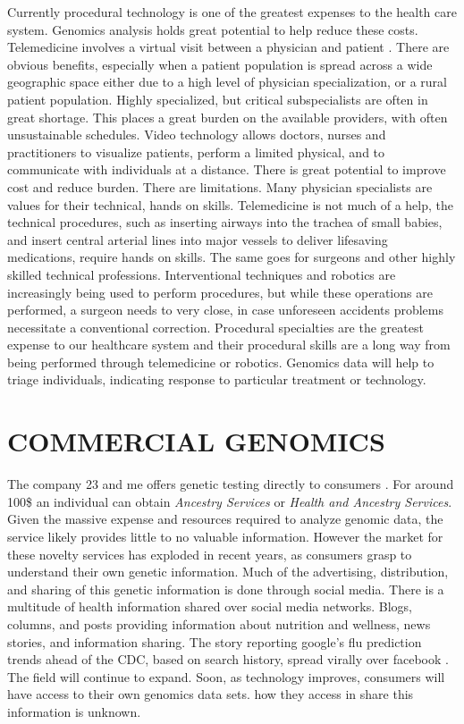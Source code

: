 \documentclass[sigconf]{acmart}
\begin{document}
Currently procedural technology is one of the greatest expenses to the health care system.  Genomics analysis holds great potential to help reduce these costs. Telemedicine involves a virtual visit between a physician and patient
\cite{hernandez2016pediatric}.  There are obvious benefits, especially when a patient population
is spread across a wide geographic space either due to a high level of
physician specialization, or a rural patient population. Highly
specialized, but critical subspecialists are often in great shortage.
This places a great burden on the available providers, with often
unsustainable schedules.  Video technology allows doctors, nurses and
practitioners to visualize patients, perform a limited physical, and
to communicate with individuals at a distance.  There is great
potential to improve cost and reduce burden. There are limitations.
Many physician specialists are values for their technical, hands on
skills.  Telemedicine is not much of a help, the technical procedures,
such as inserting airways into the trachea of small babies, and insert
central arterial lines into major vessels to deliver lifesaving
medications, require hands on skills.  The same goes for surgeons and
other highly skilled technical professions.  Interventional techniques
and robotics are increasingly being used to perform procedures, but
while these operations are performed, a surgeon needs to very close,
in case unforeseen accidents problems necessitate a conventional
correction. Procedural specialties are the greatest expense to our
healthcare system and their procedural skills are a long way from
being performed through telemedicine or robotics.  Genomics data will help to triage individuals, indicating response to particular treatment or technology.
 
 
\section{COMMERCIAL GENOMICS}

The company 23 and me offers genetic testing directly to consumers \cite{zettler201423andme}.  For around 100\$ an individual can obtain {\em Ancestry Services} or {\em Health and Ancestry Services}.  Given the massive expense and resources required to analyze genomic data, the service likely provides little to no valuable information.  However the market for these novelty services has exploded in recent years, as consumers grasp to understand their own genetic information.  Much of the advertising, distribution, and sharing of this genetic information is done through social media.  There is a multitude of health information shared
over social media networks.  Blogs, columns, and posts providing
information about nutrition and wellness, news stories, and
information sharing.  The story reporting google’s flu prediction
trends ahead of the CDC, based on search history, spread virally over
facebook \cite{ginsberg2009detecting}.   The field will continue to expand.  Soon, as technology improves, consumers will have access to their own genomics data sets.  how they access in share this information is unknown.    
\end{document}
